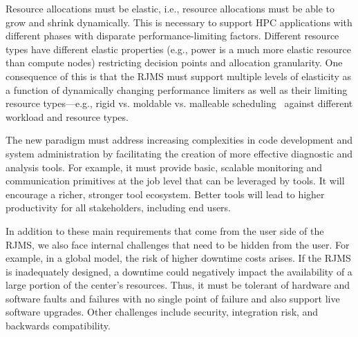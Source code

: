 Resource allocations
must be elastic, i.e., resource allocations must be able to grow and shrink
dynamically. This is necessary to support HPC applications with different
phases with disparate performance-limiting factors.
Different resource types have different
elastic properties 
(e.g., power is a much more elastic resource than compute nodes)
restricting decision points and allocation granularity.
One consequence of this is that the RJMS must 
support multiple levels of elasticity 
as a function of dynamically changing performance limiters
as well as their limiting resource types---e.g., 
rigid vs. moldable vs. malleable scheduling~\cite{Convergence} 
against different workload and resource types.

The new paradigm must address increasing complexities
in code development and system administration by facilitating
the creation of more effective diagnostic and analysis tools.
For example, it must provide basic, scalable monitoring and communication
primitives at the job level that can be leveraged by tools.
It will encourage a richer, stronger tool ecosystem.
Better tools will lead to higher productivity for all
stakeholders, including end users.

In addition to these main requirements that come from the user side
of the RJMS, we also face internal challenges that need to be hidden
from the user. 
For example, in a global model,
the risk of higher downtime costs arises. 
If the RJMS is inadequately designed, a downtime could negatively
impact the availability of a large portion of the center's
resources. Thus, it must be tolerant of hardware and software
faults and failures with no single point of failure and 
also support live software upgrades. 
Other challenges include security, integration risk, 
and backwards compatibility. 

%

